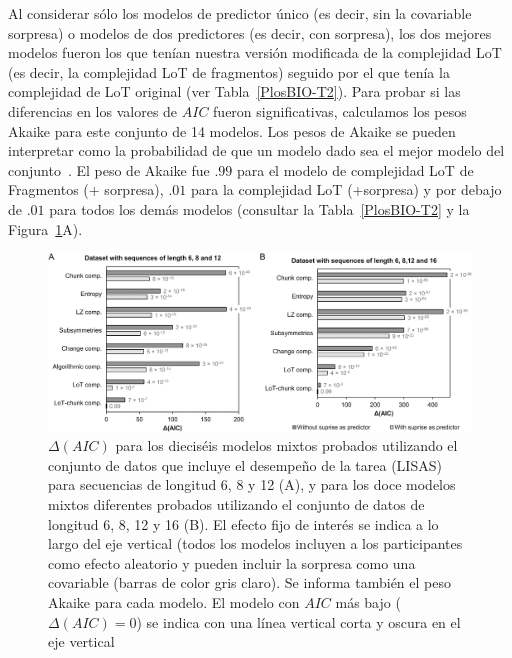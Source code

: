 Al considerar sólo los modelos de predictor único (es decir, sin la covariable sorpresa) o modelos de dos predictores (es decir, con sorpresa), los dos mejores modelos fueron los que tenían nuestra versión modificada de la complejidad LoT (es decir, la complejidad LoT de fragmentos) seguido por el que tenía la complejidad de LoT original (ver Tabla~\ref{PlosBIO-T2}). Para probar si las diferencias en los valores de $AIC$ fueron significativas, calculamos los pesos Akaike para este conjunto de 14 modelos. Los pesos de Akaike se pueden interpretar como la probabilidad de que un modelo dado sea el mejor modelo del conjunto~\cite{f106}. El peso de Akaike fue $.99$ para el modelo de complejidad LoT de Fragmentos (+ sorpresa), $.01$ para la complejidad LoT (+sorpresa) y por debajo de $.01$ para todos los demás modelos (consultar la Tabla~\ref{PlosBIO-T2} y la Figura~\ref{PlosBIO-F8}A).

\begin{figure}[t!]
   \includegraphics[scale=0.8]{figuras/plosbio/journal.pcbi.1008598.g008.PNG}
   
   \centering
   
   \caption{$\Delta(AIC)$ para los dieciséis modelos mixtos probados utilizando el conjunto de datos que incluye el desempeño de la tarea (LISAS) para secuencias de longitud 6, 8 y 12 (A), y para los doce modelos mixtos diferentes probados utilizando el conjunto de datos de longitud 6, 8, 12 y 16 (B). El efecto fijo de interés se indica a lo largo del eje vertical (todos los modelos incluyen a los participantes como efecto aleatorio y pueden incluir la sorpresa como una covariable (barras de color gris claro). Se informa también el peso Akaike para cada modelo. El modelo con $AIC$ más bajo ($\Delta (AIC) = 0$) se indica con una línea vertical corta y oscura en el eje vertical}
   \label{PlosBIO-F8}
\end{figure}

